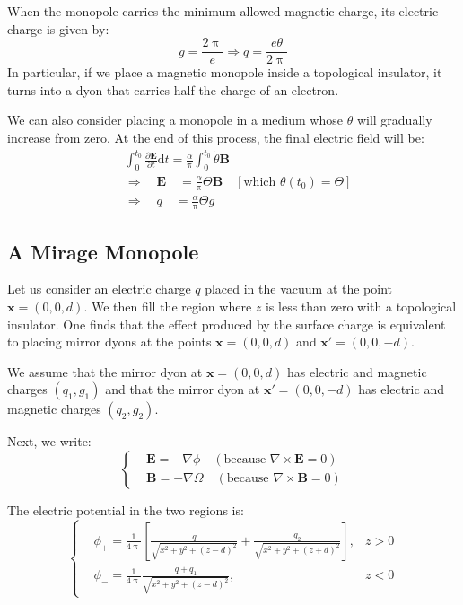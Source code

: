 When the monopole carries the minimum allowed magnetic charge, its electric charge is given by:
\begin{equation}
g = \frac{2 \uppi}{e} \Rightarrow q = \frac{e \theta}{2 \uppi}
\end{equation}
In particular, if we place a magnetic monopole inside a topological insulator, it turns into a dyon that carries half the charge of an electron.

We can also consider placing a monopole in a medium whose $\theta$ will gradually increase from zero. At the end of this process, the final electric field will be:
\begin{equation}
\begin{aligned}
&\int_0^{t_0} \frac{\partial \bm{E}}{\partial t} \mathrm{d} t = \frac{\alpha}{\uppi} \int_0^{t_0} \dot{\theta} \bm{B} \\
&\Rightarrow \quad \bm{E} \quad = \frac{\alpha}{\uppi} \Theta \bm{B} \quad [\text{which } \theta(t_0)=\Theta] \\
&\Rightarrow \quad q \quad = \frac{\alpha}{\uppi} \Theta g
\end{aligned}
\end{equation}

\subsection{A Mirage Monopole}

Let us consider an electric charge $q$ placed in the vacuum at the point $\bm{x}=(0,0,d)$. We then fill the region where $z$ is less than zero with a topological insulator. One finds that the effect produced by the surface charge is equivalent to placing mirror dyons at the points $\bm{x}=(0,0,d)$ and $\bm{x}'=(0,0,-d)$.

We assume that the mirror dyon at $\bm{x}=(0,0,d)$ has electric and magnetic charges $(q_1, g_1)$ and that the mirror dyon at $\bm{x}'=(0,0,-d)$ has electric and magnetic charges $(q_2, g_2)$.

Next, we write:
\begin{equation}
\left\{
\begin{aligned}
&\bm{E} = -\nabla \phi \quad (\text{because } \nabla \times \bm{E} = 0) \\
&\bm{B} = -\nabla \Omega \quad (\text{because } \nabla \times \bm{B} = 0)
\end{aligned}
\right.
\end{equation}

The electric potential in the two regions is:
\begin{equation}
\left\{
\begin{aligned}
&\phi_+ = \frac{1}{4\uppi} \left[ \frac{q}{\sqrt{x^2+y^2+(z-d)^2}} + \frac{q_2}{\sqrt{x^2+y^2+(z+d)^2}} \right] , & z > 0 \\
&\phi_- = \frac{1}{4\uppi} \frac{q+q_1}{\sqrt{x^2+y^2+(z-d)^2}} , & z < 0
\end{aligned}
\right.
\end{equation}


